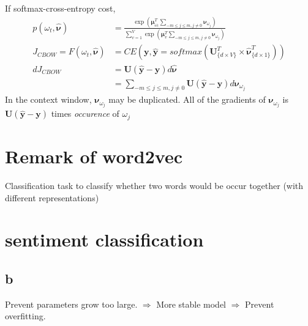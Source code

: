 \documentclass[11pt, oneside]{article}   	%
\begin{document}
If softmax-cross-entropy cost, 
\begin{align}
p(\omega_t, \hat{\bm{\nu}}) &= \frac{\exp(\bm\mu_{\omega_t}^T \sum_{-m\leq j\leq m, j\neq 0}\bm\nu_{\omega_j})}{\sum_{v = 1}^V\exp(\bm\mu_v^T \sum_{-m\leq j\leq m, j\neq 0}\bm\nu_{\omega_j})}\\
J_{CBOW} = F(\omega_t, \hat{\bm{\nu}}) &= CE(\bm{y}, \hat{\bm{y}} = softmax(\bm{U}_{\{d\times V\}}^T \times \hat{\bm{\nu}}_{\{d\times 1\}}^T))\\
d J_{CBOW} &= \bm{U}(\hat{\bm{y}} - \bm{y}) d \hat{\bm{\nu}}\\
&= \sum_{-m\leq j\leq m, j\neq 0} \bm{U}(\hat{\bm{y}} - \bm{y}) d \bm\nu_{\omega_j}
\end{align}
In the context window, $\bm\nu_{\omega_j}$ may be duplicated. All of the gradients of $\bm\nu_{\omega_j}$ is $\bm{U}(\hat{\bm{y}} - \bm{y})$ times \textit{occurence} of $\omega_j$

\section{Remark of word2vec}
Classification task to classify whether two words would be occur together (with different representations)

\section{sentiment classification}

\subsection{b}
Prevent parameters grow too large. $\Rightarrow$ More stable model $\Rightarrow$ Prevent overfitting.
\end{document}
